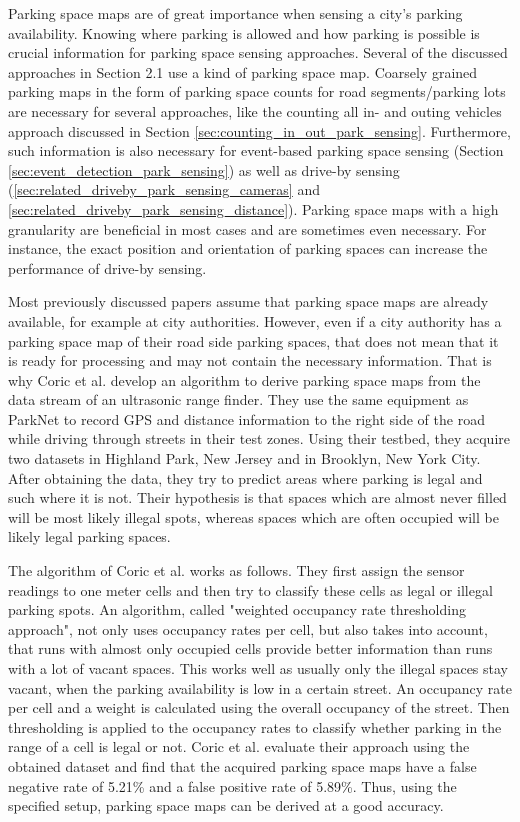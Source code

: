 Parking space maps are of great importance when sensing a city's parking availability. Knowing where parking is allowed and how parking is possible is crucial information for parking space sensing approaches. Several of the discussed approaches in Section 2.1 use a kind of parking space map. Coarsely grained parking maps in the form of parking space counts for road segments/parking lots are necessary for several approaches, like the counting all in- and outing vehicles approach discussed in Section \ref{sec:counting_in_out_park_sensing}. Furthermore, such information is also necessary for event-based parking space sensing (Section \ref{sec:event_detection_park_sensing}) as well as drive-by sensing (\ref{sec:related_driveby_park_sensing_cameras} and \ref{sec:related_driveby_park_sensing_distance}). Parking space maps with a high granularity are beneficial in most cases and are sometimes even necessary. For instance, the exact position and orientation of parking spaces can increase the performance of drive-by sensing.

Most previously discussed papers assume that parking space maps are already available, for example at city authorities. However, even if a city authority has a parking space map of their road side parking spaces, that does not mean that it is ready for processing and may not contain the necessary information. That is why Coric et al. \cite{Coric2013} develop an algorithm to derive parking space maps from the data stream of an ultrasonic range finder. They use the same equipment as ParkNet \cite{Mathur:2010:PDS:1814433.1814448} to record GPS and distance information to the right side of the road while driving through streets in their test zones. Using their testbed, they acquire two datasets in Highland Park, New Jersey and in Brooklyn, New York City. After obtaining the data, they try to predict areas where parking is legal and such where it is not. Their hypothesis is that spaces which are almost never filled will be most likely illegal spots, whereas spaces which are often occupied will be likely legal parking spaces.

The algorithm of Coric et al. works as follows. They first assign the sensor readings to one meter cells and then try to classify these cells as legal or illegal parking spots. An algorithm, called "weighted occupancy rate thresholding approach", not only uses occupancy rates per cell, but also takes into account, that runs with almost only occupied cells provide better information than runs with a lot of vacant spaces. This works well as usually only the illegal spaces stay vacant, when the parking availability is low in a certain street. An occupancy rate per cell and a weight is calculated using the overall occupancy of the street. Then thresholding is applied to the occupancy rates to classify whether parking in the range of a cell is legal or not. Coric et al. evaluate their approach using the obtained dataset and find that the acquired parking space maps have a false negative rate of 5.21\% and a false positive rate of 5.89\%. Thus, using the specified setup, parking space maps can be derived at a good accuracy.


